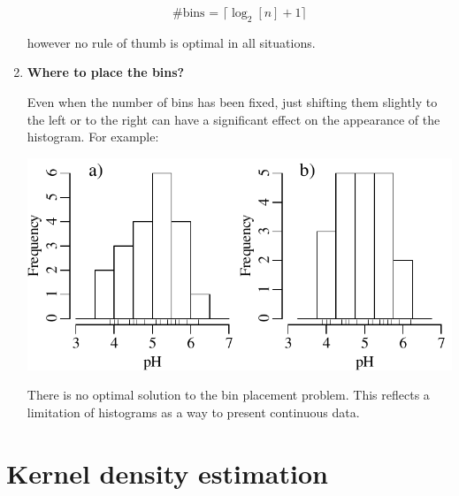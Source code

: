 \begin{enumerate}
  \begin{equation}
    \mbox{\#{bins} = } \lceil\log_2[n] + 1\rceil
  \end{equation}

  \noindent however no rule of thumb is optimal in all situations.

\item\textbf{Where to place the bins?}

Even when the number of bins has been fixed, just shifting them
slightly to the left or to the right can have a significant effect on
the appearance of the histogram. For example:

\noindent\begin{minipage}[t][][b]{.55\linewidth}
  \includegraphics[width=\textwidth]{../figures/binpos.pdf}\medskip
\end{minipage}
\begin{minipage}[t][][t]{.45\linewidth}
  \label{fig:binpos}
\end{minipage}

There is no optimal solution to the bin placement problem. This
reflects a limitation of histograms as a way to present continuous
data.

\end{enumerate}

\section{Kernel density estimation}\label{sec:KDE}

